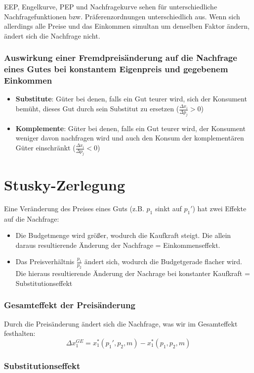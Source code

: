 EEP, Engelkurve, PEP und Nachfragekurve sehen für unterschiedliche Nachfragefunktionen bzw. Präferenzordnungen unterschiedlich aus. Wenn sich allerdings alle Preise und das Einkommen simultan um denselben Faktor ändern, ändert sich die Nachfrage nicht.

\subsubsection*{Auswirkung einer Fremdpreisänderung auf die Nachfrage eines Gutes bei konstantem Eigenpreis und gegebenem Einkommen}

\begin{itemize}
	\item \textbf{Substitute}: Güter bei denen, falls ein Gut teurer wird, sich der  Konsument bemüht, dieses Gut durch sein Substitut zu ersetzen ($\frac{\Delta x_i}{\Delta p_j} > 0$)
	\item \textbf{Komplemente}: Güter bei denen, falls ein Gut teurer wird, der Konsument weniger davon nachfragen wird und auch den Konsum der komplementären Güter einschränkt ($\frac{\Delta x_i}{\Delta p_j} < 0$)
\end{itemize}

\section{Stusky-Zerlegung}

Eine Veränderung des Preises eines Guts (z.B. $p_1$ sinkt auf $p_1'$) hat zwei Effekte auf die Nachfrage:
\begin{itemize}
	\item Die Budgetmenge wird größer, wodurch die Kaufkraft steigt. Die allein daraus resultierende Änderung der Nachfrage = Einkommenseffekt.
	\item Das Preisverhältnis $\frac{p_1}{p_2}$ ändert sich, wodurch die Budgetgerade flacher wird. Die hieraus  resultierende Änderung der Nachrage bei konstanter Kaufkraft = Substitutionseffekt
\end{itemize}

\subsubsection*{Gesamteffekt der Preisänderung}

Durch die Preisänderung ändert sich die Nachfrage, was wir im Gesamteffekt festhalten:
	$$ \Delta x_1^{GE} = x_1^{*}(p_1', p_2, m) - x_1^*(p_1, p_2, m) $$
	
\subsubsection*{Substitutionseffekt}

